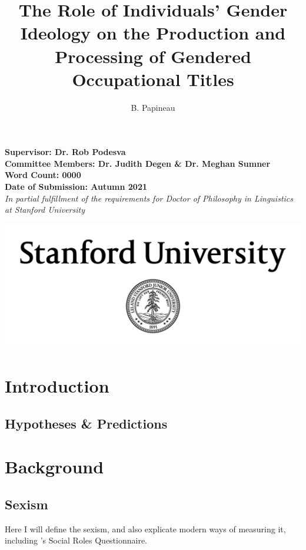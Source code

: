 \documentclass{article}
\title{\vspace{-3cm}The Role of Individuals' Gender Ideology on the Production and Processing of Gendered Occupational Titles\\}
\author{B. Papineau}
\date{}
\begin{document}
	
	\maketitle
	\begin{center}
		\textbf{Supervisor: Dr. Rob Podesva}\\
		\textbf{Committee Members: Dr. Judith Degen \& Dr. Meghan Sumner}\\
		\textbf{Word Count: 0000}\\
		\textbf{Date of Submission: Autumn 2021}\\
		\vspace{1cm}
		\textit{In partial fulfillment of the requirements for Doctor of Philosophy in Linguistics at Stanford University}
	\end{center}
	
	\vspace{1.5cm}
	\begin{center}
		\centering
		\includegraphics[scale=1]{SUSig_Black_Seal_Center.png}
	\end{center}
	
	\newpage
	
	\tableofcontents
	
	\newpage
	\setcounter{page}{1}
	
	\section{Introduction}
	
	\subsection{Hypotheses \& Predictions}
	
	\newpage
	\section{Background}
	
	\subsection{Sexism}
	Here I will define the sexism, and also explicate modern ways of measuring it, including \textcite{baber2006social}'s Social Roles Questionnaire.
	
\end{document}
